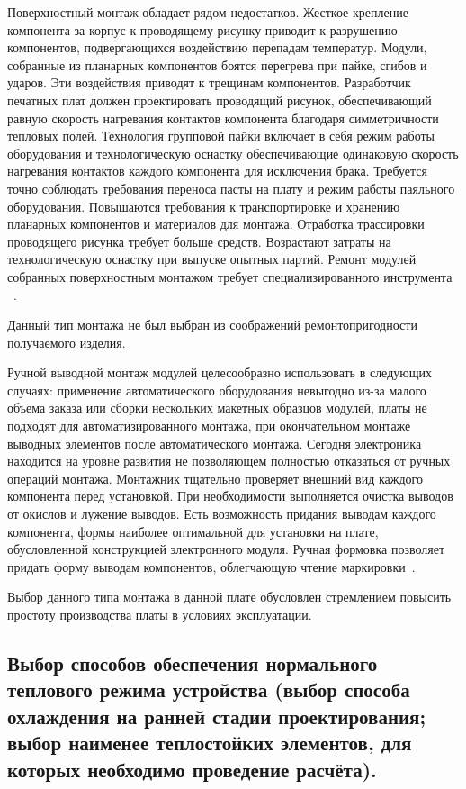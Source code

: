 Поверхностный монтаж обладает рядом недостатков. Жесткое крепление
компонента за корпус к проводящему рисунку приводит к разрушению
компонентов, подвергающихся воздействию перепадам температур. Модули,
собранные из планарных компонентов боятся перегрева при пайке, сгибов
и ударов. Эти воздействия приводят к трещинам компонентов. Разработчик
печатных плат должен проектировать проводящий рисунок, обеспечивающий
равную скорость нагревания контактов компонента благодаря
симметричности тепловых полей. Технология групповой пайки включает в
себя режим работы оборудования и технологическую оснастку
обеспечивающие одинаковую скорость нагревания контактов каждого
компонента для исключения брака. Требуется точно соблюдать требования
переноса пасты на плату и режим работы паяльного
оборудования. Повышаются требования к транспортировке и хранению
планарных компонентов и материалов для монтажа. Отработка трассировки
проводящего рисунка требует больше средств. Возрастают затраты на
технологическую оснастку при выпуске опытных партий. Ремонт модулей
собранных поверхностным монтажом требует специализированного
инструмента ~\cite{платы.рф-монтаж}.

Данный тип монтажа не был выбран из соображений ремонтопригодности
получаемого изделия.

Ручной выводной монтаж модулей целесообразно использовать в следующих
случаях: применение автоматического оборудования невыгодно из-за
малого объема заказа или сборки нескольких макетных образцов модулей,
платы не подходят для автоматизированного монтажа, при окончательном
монтаже выводных элементов после автоматического монтажа. Сегодня
электроника находится на уровне развития не позволяющем полностью
отказаться от ручных операций монтажа. Монтажник тщательно проверяет
внешний вид каждого компонента перед установкой. При необходимости
выполняется очистка выводов от окислов и лужение выводов. Есть
возможность придания выводам каждого компонента, формы наиболее
оптимальной для установки на плате, обусловленной конструкцией
электронного модуля. Ручная формовка позволяет придать форму выводам
компонентов, облегчающую чтение маркировки~\cite{платы.рф-монтаж}.

Выбор данного типа монтажа в данной плате обусловлен
стремлением повысить простоту производства платы в условиях эксплуатации.


\subsection{Выбор способов обеспечения
  нормального теплового режима устройства
  (выбор способа охлаждения
  на ранней стадии проектирования;
  выбор наименее теплостойких элементов,
  для которых необходимо проведение расчёта). }

